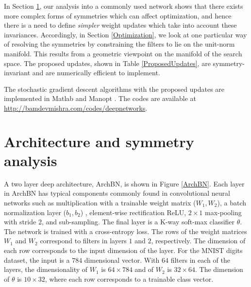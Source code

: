 \documentclass{article} %
\newcommand{\changeBM}[1]{#1} %
\newcommand{\changeVB}[1]{#1} %
\begin{document}
  
\changeBM{In Section \ref{Architecture},} our analysis into a commonly used network \changeBM{shows that} there \changeBM{exists} more complex forms of symmetries which can affect optimization, and hence there is a need to define \changeBM{\emph{simpler}} weight updates which take into account these invariances. \changeBM{Accordingly, in Section \ref{Optimization}, we look at \changeBM{one particular} way of resolving the symmetries} \changeVB{by constraining the filters to lie on \changeBM{the} unit-norm manifold. This results from a geometric viewpoint on the manifold of the search space. The proposed \changeBM{updates, shown in Table \ref{ProposedUpdates}, are symmetry-invariant and are} numerically efficient to implement.}


\changeBM{The stochastic gradient descent algorithms with the proposed updates are implemented in Matlab and Manopt \cite{ManOpt}. The codes are available at \url{http://bamdevmishra.com/codes/deepnetworks}.}








\section{Architecture and symmetry analysis}
\label{Architecture}
A two layer deep architecture, ArchBN, is shown in Figure \ref{ArchBN}. Each layer in ArchBN has typical components commonly found in convolutional neural networks \cite{LeCunNature} such as multiplication with a trainable weight matrix ($W_{1},W_{2}$), a batch normalization layer ($b_{1},b_{2}$) \cite{BN}, element-wise rectification ReLU, $2\times1$ max-pooling with stride 2, and sub-sampling. The final layer is a K-way soft-max classifier $\theta$. The network is trained with a cross-entropy loss. \changeVB{The rows of the weight matrices $W_{1}$ and $W_{2}$ correspond to filters in layers $1$ and $2$, respectively. The dimension of each row corresponds to the input dimension of the layer. For the MNIST digits dataset, the input is a $784$ dimensional vector. With $64$ filters in each of the layers, the dimensionality of $W_{1}$ is $64\times784$ and of $W_{2}$ is $32\times64$. The dimension of $\theta$ is $10\times32$, where each row corresponds to a trainable class vector.} 
\end{document}
